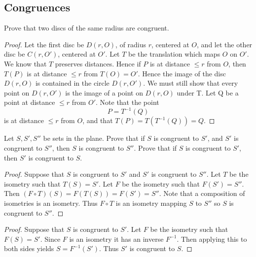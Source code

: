 \subsection{Congruences}

\begin{tcolorbox}[title=Problem 1, breakable]
    Prove that two discs of the same radius are congruent.
\end{tcolorbox}

\begin{proof}
    Let the first disc be $D(r, O)$, of radius $r$, centered at $O$, and let
    the other disc be $C(r, O')$, centered at $O'$. Let $T$ be the translation which
    maps $O$ on $O'$. We know that $T$ preserves distances. Hence if $P$ is at distance
    $\le r$ from $O$, then $T(P)$ is at distance $\le r$ from $T(O) = O'$. Hence the image of the
    disc $D(r, O)$ is contained in the circle $D(r, O')$. We must still show that every
    point on $D(r, O')$ is the image of a point on $D(r, O)$ under T. Let Q be a point
    at distance $\le r$ from $O'$. Note that the point
    \[P = T^{-1}(Q)\]
    is at distance $\le r$ from $O$, and that $T(P) = T(T^{-1}(Q)) = Q$.
\end{proof}

\begin{tcolorbox}[title=Problem 2, breakable]
    Let $S, S', S''$ be sets in the plane.
    Prove that if $S$ is congruent to $S'$,
        and $S'$ is congruent to $S''$,
        then $S$ is congruent to $S''$.
    Prove that if $S$ is congruent to $S'$,
        then $S'$ is congruent to $S$.
\end{tcolorbox}

\begin{proof}
    Suppose that $S$ is congruent to $S'$ and $S'$ is congruent to $S''$.
    Let $T$ be the isometry such that $T(S) = S'$.
    Let $F$ be the isometry such that $F(S') = S''$.
    Then $(F \circ T)(S) = F(T(S)) = F(S') = S''$.
    Note that a composition of isometries is an isometry.
    Thus $F \circ T$ is an isometry mapping $S$ to $S''$ 
        so $S$ is congruent to $S''$.
\end{proof}

\begin{proof}
    Suppose that $S$ is congruent to $S'$.
    Let $F$ be the isometry such that $F(S) = S'$.
    Since $F$ is an isometry it has an inverse $F^{-1}$.
    Then applying this to both sides yields $S = F^{-1}(S')$.
    Thus $S'$ is congruent to $S$.
\end{proof}

